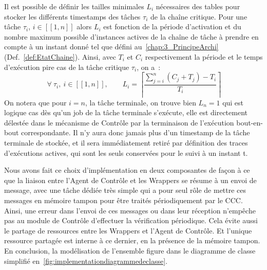 \documentclass[french, a4paper, 11pt, twoside, pdftex]{StyleThese}
\begin{document}
	Il est possible de définir les tailles minimales $L_i$ nécessaires des tables pour stocker les différents timestamps des tâches $\tau_i$ de la chaîne critique. Pour une tâche $\tau_i$, $i \in [\![1,n]\!]$ alors $L_i$ est fonction de la période d'activation et du nombre maximum possible d'instances actives de la chaîne de tâche à prendre en compte à un instant donné tel que défini au~\autoref{chap:3_PrincipeArchi} (Def.~\ref{def:EtatChaine}). Ainsi, avec $T_i$ et $C_i$ respectivement la période et le temps d'exécution pire cas de la tâche critique $\tau_i$, on a~: 
	\begin{equation}~\label{Cond:sizeBuffers}
		\forall~\tau_i, \  i \in [\![ 1, n ]\!],  \qquad L_i = \left\lceil \frac{\sum_{j=i}^{n}(C_j + T_j)-T_i}{T_i} \right\rceil
	\end{equation}
	On notera que pour $i=n$, la tâche terminale, on trouve bien $L_n=1$ qui est logique cas dès qu'un job de la tâche terminale s'exécute, elle est directement délestée dans le mécanisme de Contrôle par la terminaison de l'exécution bout-en-bout correspondante. Il n'y aura donc jamais plus d'un timestamp de la tâche terminale de stockée, et il sera immédiatement retiré par définition des traces d'exécutions actives, qui sont les seuls conservées pour le suivi à un instant t.
	
	\pagebreak
	
	Nous avons fait ce choix d'implémentation en deux composantes de façon à ce que la liaison entre l'Agent de Contrôle et les Wrappers se résume à un envoi de message, avec une tâche dédiée très simple qui a pour seul rôle de mettre ces messages en mémoire tampon pour être traités périodiquement par le CCC. Ainsi, une erreur dans l'envoi de ces messages ou dans leur réception n'empêche pas au module de Contrôle d'effectuer la vérification périodique. Cela évite aussi le partage de ressources entre les Wrappers et l'Agent de Contrôle. Et l'unique ressource partagée est interne à ce dernier, en la présence de la mémoire tampon. En conclusion, la modélisation de l'ensemble figure dans le diagramme de classe simplifié en~\autoref{fig:implementationdiagrammedeclasse}.
	
	
\end{document}
